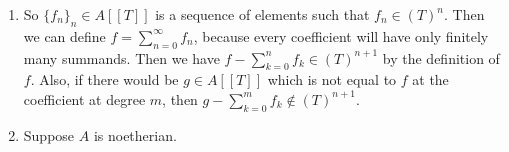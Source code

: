 \newcommand{\sheet}{3}




\maketitle

\begin{exercise}{1}
    \begin{enumerate}
        \item So $\{f_n\}_n \in A[[T]]$ is a sequence of elements such that $f_n
            \in {(T)}^n$. Then we can define $f = \sum^{\infty}_{n = 0} f_n$,
            because every coefficient will have only finitely many summands.
            Then we have $f - \sum^{n}_{k = 0} f_k \in {(T)}^{n+1}$ by
            the definition of $f$. Also, if there would be $g \in A[[T]]$ which
            is not equal to $f$ at the coefficient at degree $m$, then $g -
            \sum^{m}_{k = 0} f_k \notin {(T)}^{n+1}$.
        \item Suppose $A$ is noetherian.
    \end{enumerate}
\end{exercise}


